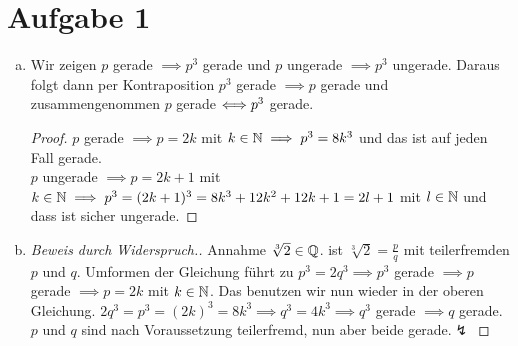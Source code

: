 \documentclass{article}
\begin{document}
	\section*{Aufgabe 1}
	\begin{enumerate}[a)]
		\item Wir zeigen $p$ gerade  $\implies p^3$ gerade und $p$ ungerade $\implies p^3$ ungerade. Daraus folgt dann per Kontraposition $p^3$ gerade $\implies p$ gerade und zusammengenommen $p$ gerade $\Longleftrightarrow p^3$ gerade.
		\begin{proof}
		$p$ gerade $\implies p=2k$ mit $k\in \mathbb{N} \implies p^3 = 8k^3$ und das ist auf jeden Fall gerade.\\
		$p$ ungerade $\implies p=2k+1$ mit $k\in \mathbb{N}\implies p^3 = (2k+1)^3 = 8k^3 + 12 k^2 + 12 k + 1 = 2l + 1$ mit $l\in \mathbb{N}$ und dass ist sicher ungerade.
		\end{proof}
		\item \begin{proof}[Beweis durch Widerspruch.]
			Annahme $\sqrt[3]{2} \in \mathbb{Q}$. \obda ist $\sqrt[3]{2} = \frac{p}{q}$ mit teilerfremden $p$ und $q$. Umformen der Gleichung führt zu $p^3 = 2q^3 \implies p^3$ gerade $\implies p$ gerade $\implies p = 2k$ mit $k\in \mathbb{N}$. Das benutzen wir nun wieder in der oberen Gleichung. $2q^3 = p^3 = (2k)^3 = 8k^3 \implies q^3 = 4k^3 \implies q^3$ gerade $\implies q$ gerade. $p$ und $q$ sind nach Voraussetzung teilerfremd, nun aber beide gerade.$\lightning$
		\end{proof}
	\end{enumerate}
\end{document}
